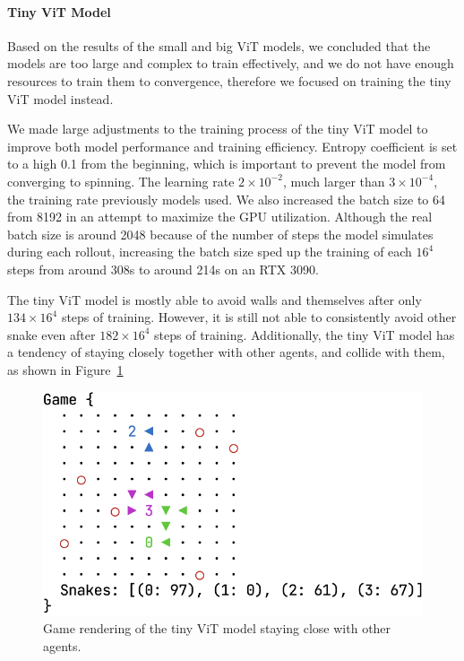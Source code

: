 \documentclass[conference]{IEEEtran}
\begin{document}
\paragraph{Tiny ViT Model}
Based on the results of the small and big ViT models,
we concluded that the models are too large and complex to train effectively,
and we do not have enough resources to train them to convergence,
therefore we focused on training the tiny ViT model instead.

We made large adjustments to the training process of the tiny ViT model to
improve both model performance and training efficiency.
Entropy coefficient is set to a high 0.1 from the beginning,
which is important to prevent the model from converging to spinning.
The learning rate $2\times 10^{-2}$, much larger than $3\times 10^{-4}$,
the training rate previously models used.
We also increased the batch size to 64 from 8192 in an attempt to maximize the
GPU utilization.
Although the real batch size is around 2048 because of the number of steps the
model simulates during each rollout,
increasing the batch size sped up the training of each $16^4$ steps from around
308s to around 214s on an RTX 3090.

The tiny ViT model is mostly able to avoid walls and themselves after only
$134\times 16^4$ steps of training. However,
it is still not able to consistently avoid other snake even after $182\times
16^4$ steps of training. Additionally,
the tiny ViT model has a tendency of staying closely together with other agents,
and collide with them, as shown in Figure~\ref{fig:tiny-vit-close-render}

\begin{figure}
    \centering
    \includegraphics[width=\linewidth]{tiny_vit_close_render.png}
    \caption{Game rendering of the tiny ViT model staying close with other
        agents.
    }
    \label{fig:tiny-vit-close-render}
\end{figure}
\end{document}
